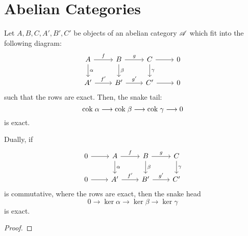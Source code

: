 \section{Abelian Categories}

\begin{prop}
Let $A, B, C, A', B', C'$ be objects of an abelian category 
$\mathscr{A}$ which fit into the following diagram:
\[
\begin{tikzcd}
A \arrow{r}{f} \arrow{d}{\alpha} &
B \arrow{r}{g} \arrow{d}{\beta} &
C \arrow{r} \arrow{d}{\gamma} &
0 \\
A' \arrow{r}{f'} &
B' \arrow{r}{g'} &
C' \arrow{r} &
0
\end{tikzcd}
\]
such that the rows are exact. Then, the snake tail:
\[
\mathrm{cok}\; \alpha \longrightarrow \mathrm{cok}\; \beta \longrightarrow \mathrm{cok}\; \gamma \longrightarrow 0
\] 
is exact.

Dually, if
\[
\begin{tikzcd}
0 \arrow{r}&
A \arrow{r}{f} \arrow{d}{\alpha} &
B \arrow{r}{g} \arrow{d}{\beta} &
C \arrow{d}{\gamma} \\
0 \arrow{r}&
A' \arrow{r}{f'} &
B' \arrow{r}{g'} &
C' 
\end{tikzcd}
\]
is commutative, where the rows are exact, then the snake
head
\[
0 \to \ker \alpha \to \ker \beta \to \ker \gamma
\]
is exact.
\end{prop}

\begin{proof}

\end{proof}
